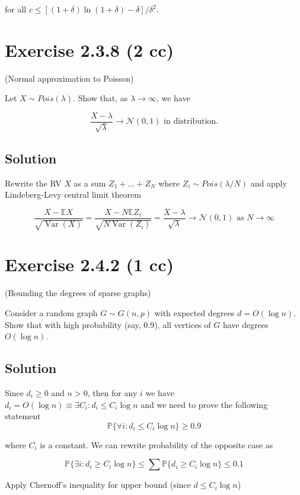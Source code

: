 \documentclass{article}
\DeclareMathOperator{\Var}{Var}
\begin{document}
for all $c \leq [(1+\delta)\ln (1+\delta) - \delta]/\delta^2$.

\section{Exercise 2.3.8 (2 cc)}
(Normal approximation to Poisson)

Let $X \sim Pois(\lambda)$. Show that, as $\lambda \to \infty$, we have

$$\frac{X-\lambda}{\sqrt \lambda} \to \mathcal N(0, 1) \text{ in distribution.}$$

\subsection{Solution}

Rewrite the RV $X$ as a sum $Z_1 + \dots + Z_N$ where $Z_i \sim Pois(\lambda/N)$ and apply Lindeberg-Levy central limit theorem

$$\frac{X - \mathbb E X}{\sqrt{\Var(X)}} = \frac{X - N \mathbb E Z_i}{\sqrt{N \Var(Z_i)}} = \frac{X-\lambda}{\sqrt \lambda} \to \mathcal N(0, 1) \text{ as } N \to \infty$$

\section{Exercise 2.4.2 (1 cc)}

(Bounding the degrees of sparse graphs)

Consider a random graph $G \sim G(n,p)$ with expected degrees $d = O(\log n)$. Show that with high probability (say, 0.9), all vertices of $G$ have degrees $O(\log n)$.

\subsection{Solution}

Since $d_i \geq 0$ and $n > 0$, then for any $i$ we have $d_i = O(\log n) \equiv \exists C_i: d_i \leq C_i \log n$ and we need to prove the following statement
$$\mathbb P \{ \forall i : d_i \leq C_i \log n \} \geq 0.9$$

where $C_i$ is a constant. We can rewrite probability of the opposite case as

$$\mathbb P \{ \exists i : d_i \geq C_i \log n \} \leq \sum \mathbb P \{ d_i \geq C_i \log n \} \leq 0.1$$

Apply Chernoff’s inequality for upper bound (since $d \leq C_i \log n$)
\end{document}
